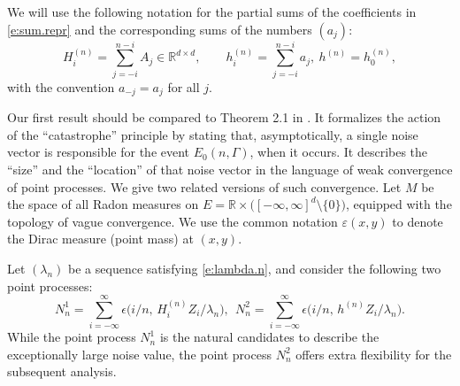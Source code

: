 \documentclass[11pt,reqno]{amsart}
\numberwithin{equation}{section}
\theoremstyle{definition}
\theoremstyle{remark}
\theoremstyle{definition}
\newcommand{\eps}{\varepsilon}
\newcommand{\R}{\mathbb{R}}
\newcommand{\RR}{\mathbb{R}}
\newcommand{\bbr}{\RR}
\begin{document}
We will use the following notation for the partial sums of the
coefficients in \eqref{e:sum.repr} and the corresponding sums of the
numbers $(a_j)$: 
\begin{equation} \label{e:coeff.sums}
    H_i^{(n)} = \sum_{j=-i}^{n-i} A_j \in \RR^{d\times d},    \qquad 
    h_i^{(n)} = \sum_{j=-i}^{n-i} a_j, \ h^{(n)}=h_0^{(n)},
\end{equation}
with the convention $a_{-j}=a_j$ for all $j$.

Our first result should be compared to Theorem 2.1 in
\cite{wang:samorodnitsky:2025}. It formalizes the action of the
``catastrophe'' principle by stating that, asymptotically, a single
noise vector is responsible for the event $E_0(n,\Gamma)$, when it
occurs. It describes the ``size'' and the ``location'' of that noise
vector in the language of weak convergence of point processes. We give two related versions of such convergence. Let $M$
be the space of all Radon measures on 
$E=\bbr\times \bigl([-\infty,\infty]^d\setminus \{0\}\bigr)$, equipped with the topology of vague
convergence.  
We use
the common notation $\eps(x, y)$ to denote the Dirac measure (point
mass) at $(x, y)$.





Let $(\lambda_n)$ be a sequence satisfying
\eqref{e:lambda.n}, and consider the following two point processes: 
\begin{equation} \label{e:point.pr}
    N_n^1 = \sum_{i=-\infty}^\infty \epsilon\big(i/n, \, H_i^{(n)} Z_i/\lambda_n\big), \ \ 
     N_n^2 = \sum_{i=-\infty}^\infty \epsilon\big(i/n, \, h^{(n)} Z_i/\lambda_n\big).
\end{equation}
While the point process  $N_n^1$ is the natural candidates to describe the exceptionally large noise value, the point process $N_n^2$ offers extra flexibility for the subsequent analysis. 
\end{document}
